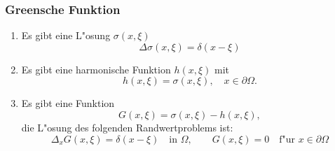 \documentclass{beamer}
\begin{document}
\begin{frame}
\frametitle{Greensche Funktion}

\begin{enumerate}[<+->]
\item
Es gibt eine L"osung $\sigma(x,\xi)$
\[
\Delta \sigma (x,\xi)=\delta(x-\xi)
\]
\item 
Es gibt eine harmonische Funktion $h(x,\xi)$ mit
\[
h(x,\xi)=\sigma(x,\xi),\quad x\in\partial\Omega.
\]
\item
Es gibt eine Funktion
\[
G(x,\xi) = \sigma(x,\xi)-h(x,\xi),
\]
die L"osung des folgenden Randwertproblems ist:
\[
\Delta_x G(x,\xi) = \delta(x-\xi)\quad\text{in $\Omega$},
\qquad
G(x,\xi)=0\quad\text{f"ur $x\in\partial\Omega$}
\]
\end{enumerate}
\end{frame}
\end{document}
